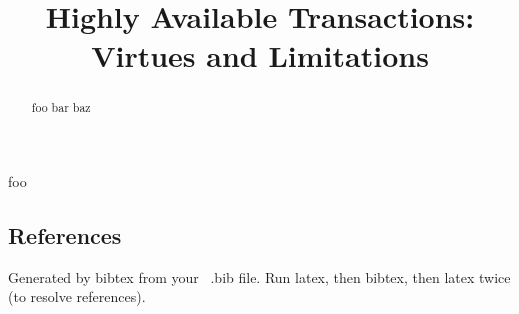 \documentclass{vldb}
\begin{document}

\title{Highly Available Transactions: Virtues and Limitations}

\maketitle

\begin{abstract}
foo bar baz
\end{abstract}


















foo~\cite{adya}


  

\subsection{References}

Generated by bibtex from your ~.bib file. Run latex, then bibtex, then
latex twice (to resolve references).


\begin{appendix}

\end{appendix}
\end{document}
